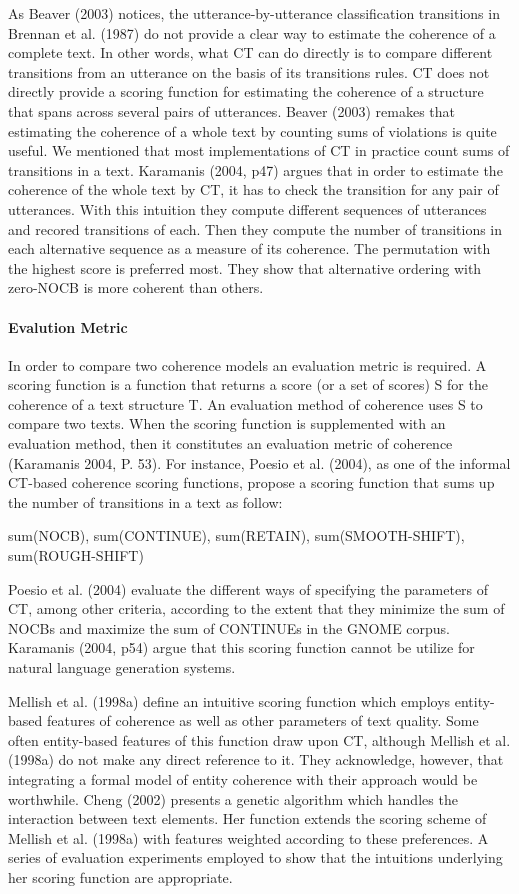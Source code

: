 As Beaver (2003) notices, the utterance-by-utterance classification transitions in Brennan et al. (1987) do not provide a clear way to estimate the coherence of a complete text. 
In other words, what CT can do directly is to compare different transitions from an utterance on the basis of its transitions rules. 
CT does not directly provide a scoring function for estimating the coherence of a structure that spans across several pairs of utterances. 
Beaver (2003) remakes that estimating the coherence of a whole text by counting sums of violations is quite useful. 
We mentioned that most implementations of CT in practice count sums of transitions in a text. 
Karamanis (2004, p47) argues that in order to estimate the coherence of the whole text by CT, it has to check the transition for any pair of utterances. 
With this intuition they compute different sequences of utterances and recored transitions of each. 
Then they compute the number of transitions in each alternative sequence as a measure of its coherence. 
The permutation with the highest score is preferred most. 
They show that alternative ordering with zero-NOCB is more coherent than others. 


\paragraph{Evalution Metric}
In order to compare two coherence models an evaluation metric is required. 
A scoring function is a function that returns a score (or a set of scores) S for the coherence of a text structure T. 
An evaluation method of coherence uses S to compare two texts. 
When the scoring function is supplemented with an evaluation method, then it constitutes an evaluation metric of coherence (Karamanis 2004, P. 53).
For instance, Poesio et al. (2004), as one of the informal CT-based coherence scoring functions, propose a scoring function that sums up the number of transitions in a text as follow:

sum(NOCB), sum(CONTINUE), sum(RETAIN), sum(SMOOTH-SHIFT), sum(ROUGH-SHIFT)

Poesio et al. (2004) evaluate the different ways of specifying the parameters of CT, among other criteria, according to the extent that they minimize the sum of NOCBs and maximize the sum of CONTINUEs in the GNOME corpus. 
Karamanis (2004, p54) argue that this scoring function cannot be utilize for natural language generation systems. 

Mellish et al. (1998a) define an intuitive scoring function which employs entity-based features of coherence as well as other parameters of text quality. 
Some often entity-based features of this function draw upon CT, although Mellish et al. (1998a) do not make any direct reference to it. They acknowledge, however, that integrating a formal model of entity coherence with their approach would be worthwhile. 
Cheng (2002) presents a genetic algorithm which handles the interaction between text elements. 
Her function extends the scoring scheme of Mellish et al. (1998a) with features weighted according to these preferences. 
A series of evaluation experiments employed to show that the intuitions underlying her scoring function are appropriate. 

